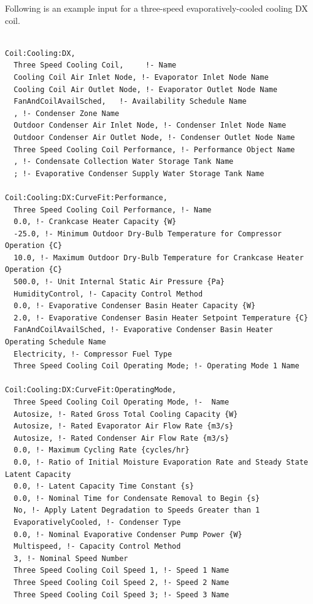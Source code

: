 \begin{lstlisting}
\end{lstlisting}

Following is an example input for a three-speed evaporatively-cooled cooling DX coil.

\begin{lstlisting}

Coil:Cooling:DX,
  Three Speed Cooling Coil,     !- Name
  Cooling Coil Air Inlet Node, !- Evaporator Inlet Node Name
  Cooling Coil Air Outlet Node, !- Evaporator Outlet Node Name
  FanAndCoilAvailSched,   !- Availability Schedule Name
  , !- Condenser Zone Name
  Outdoor Condenser Air Inlet Node, !- Condenser Inlet Node Name
  Outdoor Condenser Air Outlet Node, !- Condenser Outlet Node Name
  Three Speed Cooling Coil Performance, !- Performance Object Name
  , !- Condensate Collection Water Storage Tank Name
  ; !- Evaporative Condenser Supply Water Storage Tank Name

Coil:Cooling:DX:CurveFit:Performance,
  Three Speed Cooling Coil Performance, !- Name
  0.0, !- Crankcase Heater Capacity {W}
  -25.0, !- Minimum Outdoor Dry-Bulb Temperature for Compressor Operation {C}
  10.0, !- Maximum Outdoor Dry-Bulb Temperature for Crankcase Heater Operation {C}
  500.0, !- Unit Internal Static Air Pressure {Pa}
  HumidityControl, !- Capacity Control Method
  0.0, !- Evaporative Condenser Basin Heater Capacity {W}
  2.0, !- Evaporative Condenser Basin Heater Setpoint Temperature {C}
  FanAndCoilAvailSched, !- Evaporative Condenser Basin Heater Operating Schedule Name
  Electricity, !- Compressor Fuel Type
  Three Speed Cooling Coil Operating Mode; !- Operating Mode 1 Name

Coil:Cooling:DX:CurveFit:OperatingMode,
  Three Speed Cooling Coil Operating Mode, !-  Name
  Autosize, !- Rated Gross Total Cooling Capacity {W}
  Autosize, !- Rated Evaporator Air Flow Rate {m3/s}
  Autosize, !- Rated Condenser Air Flow Rate {m3/s}
  0.0, !- Maximum Cycling Rate {cycles/hr}
  0.0, !- Ratio of Initial Moisture Evaporation Rate and Steady State Latent Capacity
  0.0, !- Latent Capacity Time Constant {s}
  0.0, !- Nominal Time for Condensate Removal to Begin {s}
  No, !- Apply Latent Degradation to Speeds Greater than 1
  EvaporativelyCooled, !- Condenser Type
  0.0, !- Nominal Evaporative Condenser Pump Power {W}
  Multispeed, !- Capacity Control Method
  3, !- Nominal Speed Number
  Three Speed Cooling Coil Speed 1, !- Speed 1 Name
  Three Speed Cooling Coil Speed 2, !- Speed 2 Name
  Three Speed Cooling Coil Speed 3; !- Speed 3 Name


\end{lstlisting}
